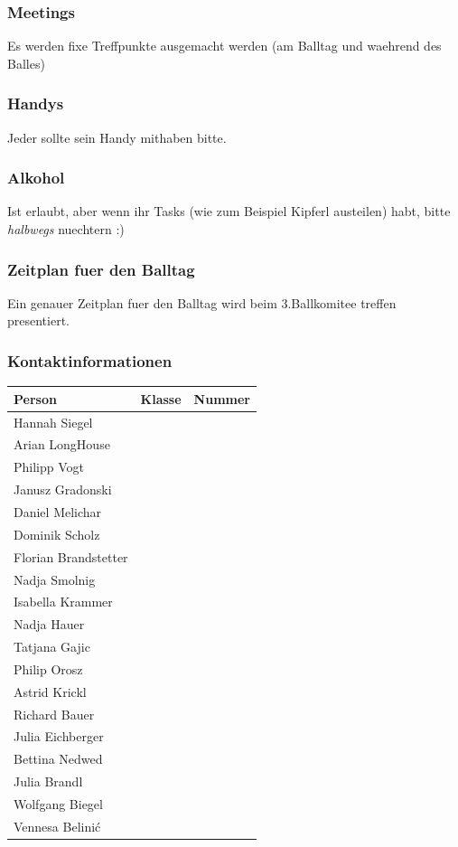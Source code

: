 \documentclass[12pt]{article}
\begin{document}
\subsubsection{Meetings}
Es werden fixe Treffpunkte ausgemacht werden (am Balltag und waehrend des Balles)
\subsubsection{Handys}
Jeder sollte sein Handy mithaben bitte.
\subsubsection{Alkohol}
Ist erlaubt, aber wenn ihr Tasks (wie zum Beispiel Kipferl austeilen) habt, bitte \textit{halbwegs} nuechtern :)
\subsubsection{Zeitplan fuer den Balltag}
Ein genauer Zeitplan fuer den Balltag wird beim 3.Ballkomitee treffen presentiert.
\subsubsection{Kontaktinformationen}

 \begin{tabular}{ | p{} | p{} |  p{} |}
    \hline
\textbf{Person} & \textbf{Klasse} & \textbf{Nummer}  \\ 
    \hline 
    \hline
   
Hannah Siegel &  & \\ \hline
Arian LongHouse &  & \\ \hline
Philipp Vogt &  & \\ \hline
Janusz Gradonski&  & \\ \hline
Daniel Melichar&  & \\ \hline
Dominik Scholz &  & \\ \hline
Florian Brandstetter &  & \\ \hline
Nadja Smolnig &  & \\ \hline
Isabella Krammer &  & \\ \hline
Nadja Hauer &  & \\ \hline
Tatjana Gajic &  & \\ \hline
Philip Orosz &  & \\ \hline
Astrid Krickl &  & \\ \hline
Richard Bauer &  & \\ \hline
Julia Eichberger &  & \\ \hline
Bettina Nedwed &  & \\ \hline
Julia Brandl &  & \\ \hline
Wolfgang Biegel  &  & \\ \hline
Vennesa Belinić &  & \\ \hline
  \end{tabular}
\FloatBarrier
\newpage
\end{document}
